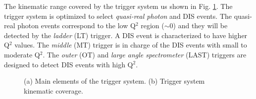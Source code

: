 The kinematic range covered by the trigger system us shown in Fig. \ref{pic:trigger}. The trigger system is optimized to select \textit{quasi-real photon} and DIS events. The quasi-real photon events correspond to the low Q$^2$ region ($\sim$0) and they will be detected by the \textit{ladder} (LT) trigger. A DIS event is characterized to have higher Q$^2$ values. The \textit{middle} (MT) trigger is in charge of the DIS events with small to moderate Q$^2$. The \textit{outer} (OT) and \textit{large angle spectrometer} (LAST) triggers are designed to detect DIS events with high Q$^2$.

\begin{figure}[!h]
  \centering
	\caption{(a) Main elements of the trigger system. (b) Trigger system kinematic coverage.}
	\label{pic:trigger}
\end{figure}


